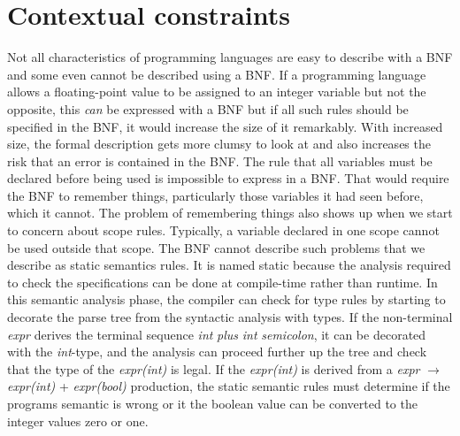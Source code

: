 \section{Contextual constraints}
Not all characteristics of programming languages are easy to describe with a BNF and some even cannot be described using a BNF. If a programming language allows a floating-point value to be assigned to an integer variable but not the opposite, this \textit{can} be expressed with a BNF but if all such rules should be specified in the BNF, it would increase the size of it remarkably. With increased size, the formal description gets more clumsy to look at and also increases the risk that an error is contained in the BNF.
The rule that all variables must be declared before being used is impossible to express in a BNF. That would require the BNF to remember things, particularly those variables it had seen before, which it cannot. The problem of remembering things also shows up when we start to concern about scope rules. Typically, a variable declared in one scope cannot be used outside that scope. The BNF cannot describe such problems that we describe as static semantics rules. It is named static because the analysis required to check the specifications can be done at compile-time rather than runtime\cite[p. 153]{sebesta2013}.
In this semantic analysis phase, the compiler can check for type rules by starting to decorate the parse tree from the syntactic analysis with types. If the non-terminal \textit{expr} derives the terminal sequence \textit{int} \textit{plus} \textit{int} \textit{semicolon}, it can be decorated with the \textit{int}-type, and the analysis can proceed further up the tree and check that the type of the \textit{expr(int)} is legal. If the \textit{expr(int)} is derived from a \textit{expr} $\rightarrow$ \textit{expr(int)} +  \textit{expr(bool)} production, the static semantic rules must determine if the programs semantic is wrong or it the boolean value can be converted to the integer values zero or one.




